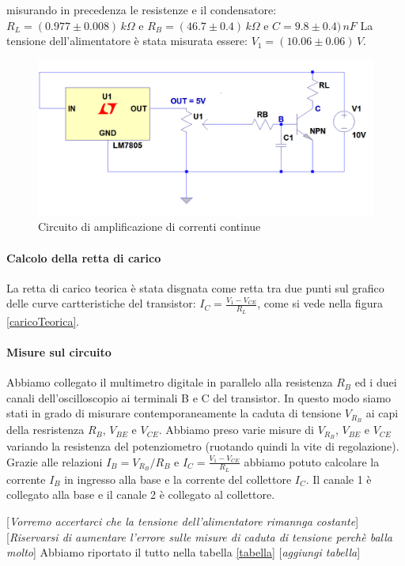 \documentclass[10pt,a4paper]{article}
\newcommand{\rem}[1]{[\emph{#1}]}
\begin{document}
misurando in precedenza le resistenze e il condensatore: $R_L = (0.977 \pm 0.008) \, k\Omega$ e $R_B= (46.7 \pm 0.4) \, k\Omega $ e $C=9.8 \pm 0.4) \, nF$
La tensione dell'alimentatore è stata misurata essere: $V_1 = (10.06 \pm 0.06) \, V$. 

\begin{figure}[!htb]
  \centering
  \includegraphics[scale=0.4]{circuito}
\caption{Circuito di amplificazione di correnti continue}
\label{circuito}
\end{figure}

\paragraph{Calcolo della retta di carico}
La retta di carico teorica è stata disgnata come retta tra due punti sul grafico delle curve cartteristiche del transistor: $I_C=\frac{V_1-V_{CE}}{R_L}$, come si vede nella figura \ref{caricoTeorica}.
\paragraph{Misure sul circuito}
Abbiamo collegato il multimetro digitale in parallelo alla resistenza $R_B$  ed i duei canali dell'oscilloscopio ai terminali B e C del transistor. In questo modo siamo stati in grado di misurare contemporaneamente la caduta di tensione $V_{R_B}$ ai capi della resristenza $R_B$, $V_{BE}$ e $V_{CE}$.
Abbiamo preso varie misure di $V_{R_B}$, $V_{BE}$ e $V_{CE}$  variando la resistenza del potenziometro (ruotando quindi la vite di regolazione). Grazie alle relazioni $I_B=V_{R_B}/R_B$ e $I_C=\frac{V_1-V_{CE}}{R_L}$ abbiamo potuto calcolare la corrente $I_B$ in ingresso alla base e la corrente del collettore $I_C$.
Il canale 1 è collegato alla base e il canale 2 è collegato al collettore.

\rem{Vorremo accertarci che la tensione dell'alimentatore rimannga costante}
\rem{Riservarsi di aumentare l'errore sulle misure di caduta di tensione perchè balla molto}
Abbiamo riportato il tutto nella tabella \ref{tabella}
\rem{aggiungi tabella}
\end{document}
